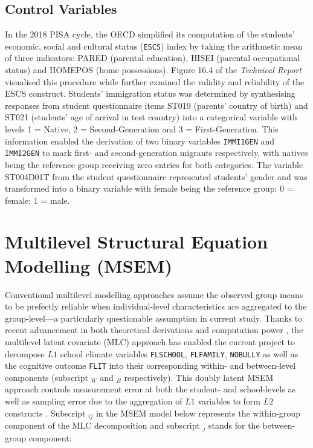 \documentclass[a4paper,11pt,UKenglish,twoside,openright]{report}\usepackage[]{graphicx}\usepackage[]{color}
\begin{document}
\subsection{Control Variables}

In the 2018 PISA cycle, the OECD simplified its computation of the students' economic, social and cultural status (\texttt{ESCS}) index by taking the arithmetic mean of three indicators: \textsf{PARED} (parental education), \textsf{HISEI} (parental occupational status) and \textsf{HOMEPOS} (home possessions). Figure 16.4 of the \textit{Technical Report} \parencite{PISAtech} visualised this procedure while \textcite{avvisati:2020} further exmined the validity and reliability of the ESCS construct. Students' immigration status was determined by synthesising responses from student questionnaire items \textsf{ST019} (parents' country of birth) and \textsf{ST021} (students' age of arrival in test country) \parencite[][pp. 212--213]{PISAvol3} into a categorical variable with levels \textsf{1 = Native}, \textsf{2 = Second-Generation} and \textsf{3 = First-Generation}. This information enabled the derivation of two binary variables \texttt{IMMI1GEN} and \texttt{IMMI2GEN} to mark first- and second-generation migrants respectively, with natives being the reference group receiving zero entries for both categories. The variable \textsf{ST004D01T} from the student questionnaire \parencite{FLdata} represented students' gender and was transformed into a binary variable with female being the reference group: \textsf{0 = female}; \textsf{1 = male}.

\section{Multilevel Structural Equation Modelling (MSEM)}

Conventional multilevel modelling approaches assume the observed group means to be prefectly reliable when individual-level characteristics are aggregated to the group-level---a particularly questionable assumption in current study. Thanks to recent advancement in both theoretical derivations \parencite{ludtke:2008, marsh:2009} and computation power \parencite{mplus}, the multilevel latent covariate (MLC) approach has enabled the current project to decompose $L1$ school climate variables \texttt{FLSCHOOL}, \texttt{FLFAMILY}, \texttt{NOBULLY} as well as the cognitive outcome \texttt{FLIT} into their corresponding within- and between-level components (subscript $_W$ and $_B$ respectively). This doubly latent MSEM approach controls measurement error at both the student- and school-levels as well as sampling error due to the aggregation of $L1$ variables to form $L2$ constructs \parencite{ludtke:2009, ludtke:2011, marsh:2012}. Subscript $_{ij}$ in the MSEM model below represents the within-group component of the MLC decomposition and subscript $_j$ stands for the between-group component:
\end{document}
